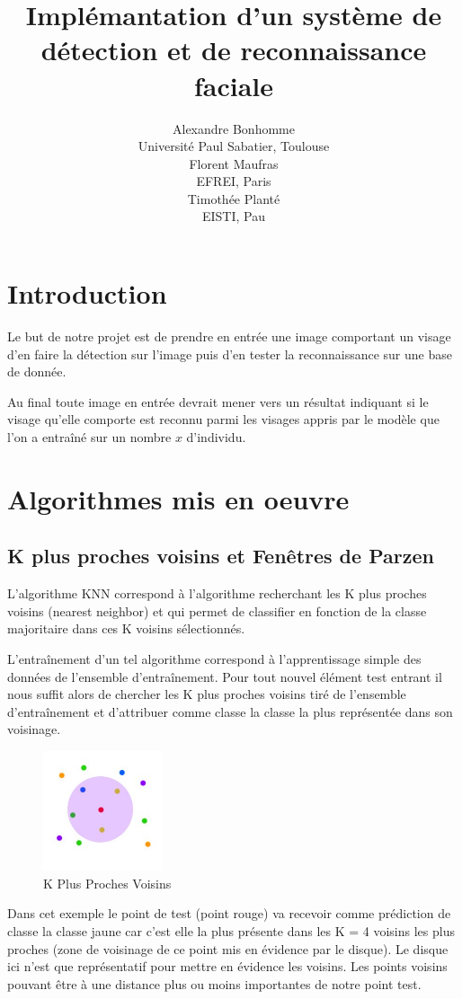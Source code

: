 \documentclass[a4paper,10pt,twocolumn]{extarticle}
\title{\textsf{Implémantation d’un système de détection et de reconnaissance faciale}}
\author{Alexandre Bonhomme\\ {\normalsize Université Paul Sabatier, Toulouse}\\
Florent Maufras\\ {\normalsize EFREI, Paris}\\
Timothée Planté\\ {\normalsize EISTI, Pau}\\}%
\date{}
\begin{document}
\maketitle
\section{Introduction}
Le but de notre projet est de prendre en entrée une image comportant un visage d'en faire la détection sur l'image puis d'en tester la reconnaissance sur une base de donnée.

Au final toute image en entrée devrait mener vers un résultat indiquant si le visage qu'elle comporte est reconnu parmi les visages appris par le modèle que l'on a entraîné sur un nombre $x$ d'individu.

\section{Algorithmes mis en oeuvre}
\subsection{K plus proches voisins et Fenêtres de Parzen}
L'algorithme KNN correspond à l'algorithme recherchant les K plus proches voisins (nearest neighbor) et qui permet de classifier en fonction de la classe majoritaire dans ces K voisins sélectionnés.

L'entraînement d'un tel algorithme correspond à l'apprentissage simple des données de l'ensemble d'entraînement. Pour tout nouvel élément test entrant il nous suffit alors de chercher les K plus proches voisins tiré de l'ensemble d'entraînement et d'attribuer comme classe la classe la plus représentée dans son voisinage.
\begin{figure}[H]
  \begin{center}
    \includegraphics[width=100pt]{images_rapport/KNN.png}
    \caption{K Plus Proches Voisins}
    \label{fig:knn}
  \end{center}
\end{figure}
Dans cet exemple le point de test (point rouge) va recevoir comme prédiction de classe la classe jaune car c'est elle la plus présente dans les K = 4 voisins les plus proches (zone de voisinage de ce point mis en évidence par le disque). Le disque ici n'est que représentatif pour mettre en évidence les voisins. Les points voisins pouvant être à une distance plus ou moins importantes de notre point test.
\end{document}
